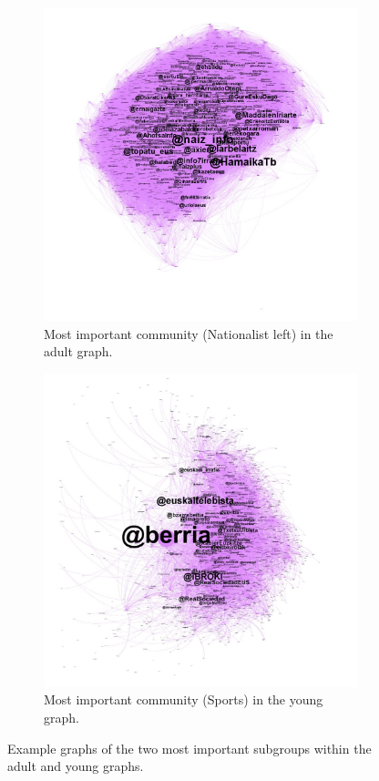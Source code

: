 \documentclass[information,article,submit,moreauthors,pdftex,10pt,a4paper]{Definitions/mdpi}
\begin{document}
\begin{figure}[H]
  \centering
  \begin{subfigure}[b]{0.49\linewidth}
    \includegraphics[width=\linewidth]{adult_graphs/c1for}
    \caption{Most important community (Nationalist left) in the adult graph.}
  \end{subfigure}
  \begin{subfigure}[b]{0.49\linewidth}
    \includegraphics[width=\linewidth]{young_graphs/c1inf}
    \caption{Most important community (Sports) in the young graph.}
  \end{subfigure}
  \caption{Example graphs of the two most important subgroups within the adult and young graphs.}
  \label{fig:hd ha2}
\end{figure}
\end{document}
